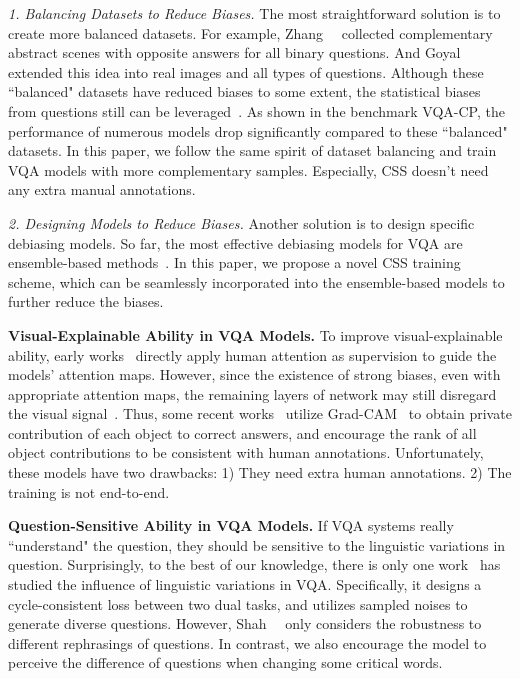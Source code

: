 \documentclass[10pt,twocolumn,letterpaper]{article}
\begin{document}
\noindent\textit{1. Balancing Datasets to Reduce Biases.} The most straightforward solution is to create more balanced datasets. For example, Zhang~\etal~\cite{zhang2016yin} collected complementary abstract scenes with opposite answers for all binary questions. And Goyal~\etal~\cite{goyal2017making} extended this idea into real images and all types of questions. Although these ``balanced" datasets have reduced biases to some extent, the statistical biases from questions still can be leveraged~\cite{agrawal2018don}. As shown in the benchmark VQA-CP, the performance of numerous models drop significantly compared to these ``balanced" datasets. In this paper, we follow the same spirit of dataset balancing and train VQA models with more complementary samples. Especially, CSS doesn't need any extra manual annotations.

\noindent\textit{2. Designing Models to Reduce Biases.} Another solution is to design specific debiasing models. So far, the most effective debiasing models for VQA are ensemble-based methods~\cite{ramakrishnan2018overcoming, grand2019adversarial, belinkov2019don, cadene2019rubi, clark2019don, mahabadi2019simple}. In this paper, we propose a novel CSS training scheme, which can be seamlessly incorporated into the ensemble-based models to further reduce the biases.

\textbf{Visual-Explainable Ability in VQA Models.}
To improve visual-explainable ability, early works~\cite{qiao2018exploring, liu2017attention, zhang2019interpretable} directly apply human attention as supervision to guide the models' attention maps. However, since the existence of strong biases, even with appropriate attention maps, the remaining layers of network may still disregard the visual signal~\cite{selvaraju2019taking}. Thus, some recent works~\cite{selvaraju2019taking, wu2019self} utilize Grad-CAM~\cite{selvaraju2017grad} to obtain private contribution of each object to correct answers, and encourage the rank of all object contributions to be consistent with human annotations. Unfortunately, these models have two drawbacks: 1) They need extra human annotations. 2) The training is not end-to-end.

\textbf{Question-Sensitive Ability in VQA Models.}
If VQA systems really ``understand" the question, they should be sensitive to the linguistic variations in question. Surprisingly, to the best of our knowledge, there is only one work~\cite{shah2019cycle} has studied the influence of linguistic variations in VQA. Specifically, it designs a cycle-consistent loss between two dual tasks, and utilizes sampled noises to generate diverse questions. However, Shah~\etal~\cite{shah2019cycle} only considers the robustness to different rephrasings of questions. In contrast, we also encourage the model to perceive the difference of questions when changing some critical words.
\end{document}
